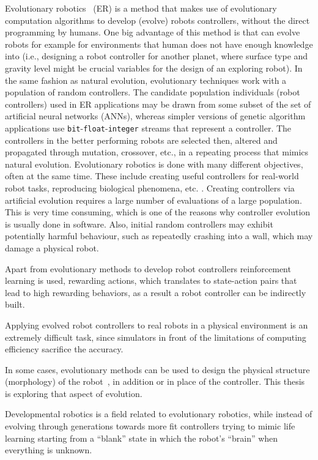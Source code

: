 Evolutionary robotics~\cite{WikievolutionaryRobotics} (ER) is a method that makes use of evolutionary computation algorithms to develop (evolve) robots controllers, without the direct programming by humans. One big advantage of this method is that can evolve robots for example for environments that human does not have enough knowledge into (i.e., designing a robot controller for another planet, where surface type and gravity level might be crucial variables for the design of an exploring robot). In the same fashion as natural evolution, evolutionary techniques work with a population of random controllers. The candidate population individuals (robot controllers) used in ER applications may be drawn from some subset of the set of artificial neural networks (ANNs), whereas simpler versions of genetic algorithm applications use \texttt{bit}-\texttt{float}-\texttt{integer} streams that represent a controller. The controllers in the better performing robots are selected then, altered and propagated through mutation, crossover, etc., in a repeating process that mimics natural evolution. Evolutionary robotics is done with many different objectives, often at the same time. These include creating useful controllers for real-world robot tasks, reproducing biological phenomena, etc. . Creating controllers via artificial evolution requires a large number of evaluations of a large population. This is very time consuming, which is one of the reasons why controller evolution is usually done in software. Also, initial random controllers may exhibit potentially harmful behaviour, such as repeatedly crashing into a wall, which may damage a physical robot.

Apart from evolutionary methods to develop robot controllers reinforcement learning is used, rewarding actions, which translates to state-action pairs that lead to high rewarding behaviors, as a result a robot controller can be indirectly built.

Applying evolved robot controllers to real robots in a physical environment is an extremely difficult task, since simulators in front of the limitations of computing efficiency sacrifice the accuracy.

In some cases, evolutionary methods can be used to design the physical structure (morphology) of the robot~\cite{hiller2010evolving}, in addition or in place of the controller. This thesis is exploring that aspect of evolution.

Developmental robotics is a field related to evolutionary robotics,  while instead of evolving through generations towards more fit controllers trying to mimic life learning starting from a ``blank'' state in which the robot's ``brain'' when everything is unknown.


